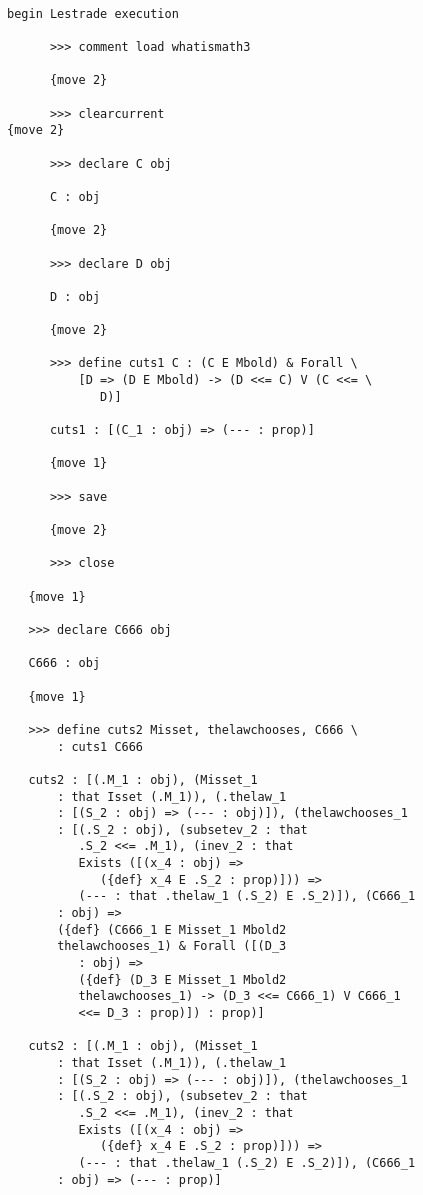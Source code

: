\documentclass[12pt]{article}
\begin{document}
\begin{verbatim}

begin Lestrade execution

      >>> comment load whatismath3

      {move 2}

      >>> clearcurrent
{move 2}

      >>> declare C obj

      C : obj

      {move 2}

      >>> declare D obj

      D : obj

      {move 2}

      >>> define cuts1 C : (C E Mbold) & Forall \
          [D => (D E Mbold) -> (D <<= C) V (C <<= \
             D)]

      cuts1 : [(C_1 : obj) => (--- : prop)]

      {move 1}

      >>> save

      {move 2}

      >>> close

   {move 1}

   >>> declare C666 obj

   C666 : obj

   {move 1}

   >>> define cuts2 Misset, thelawchooses, C666 \
       : cuts1 C666

   cuts2 : [(.M_1 : obj), (Misset_1 
       : that Isset (.M_1)), (.thelaw_1 
       : [(S_2 : obj) => (--- : obj)]), (thelawchooses_1 
       : [(.S_2 : obj), (subsetev_2 : that 
          .S_2 <<= .M_1), (inev_2 : that 
          Exists ([(x_4 : obj) => 
             ({def} x_4 E .S_2 : prop)])) => 
          (--- : that .thelaw_1 (.S_2) E .S_2)]), (C666_1 
       : obj) => 
       ({def} (C666_1 E Misset_1 Mbold2 
       thelawchooses_1) & Forall ([(D_3 
          : obj) => 
          ({def} (D_3 E Misset_1 Mbold2 
          thelawchooses_1) -> (D_3 <<= C666_1) V C666_1 
          <<= D_3 : prop)]) : prop)]

   cuts2 : [(.M_1 : obj), (Misset_1 
       : that Isset (.M_1)), (.thelaw_1 
       : [(S_2 : obj) => (--- : obj)]), (thelawchooses_1 
       : [(.S_2 : obj), (subsetev_2 : that 
          .S_2 <<= .M_1), (inev_2 : that 
          Exists ([(x_4 : obj) => 
             ({def} x_4 E .S_2 : prop)])) => 
          (--- : that .thelaw_1 (.S_2) E .S_2)]), (C666_1 
       : obj) => (--- : prop)]


\end{verbatim}
\end{document}
